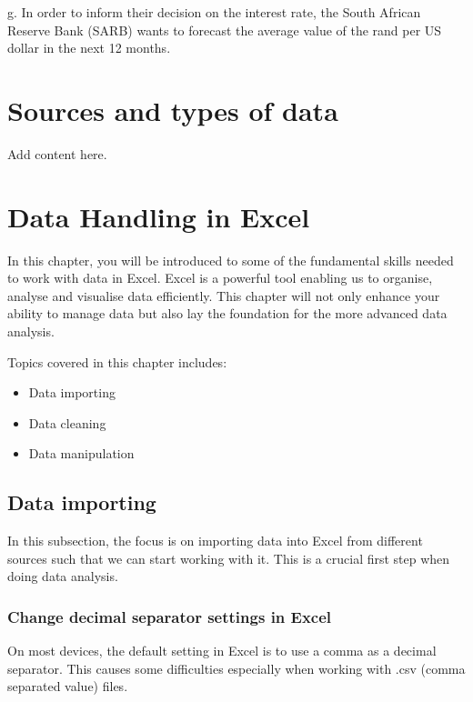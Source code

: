 \documentclass[
]{book}
\begin{document}
g. In order to inform their decision on the interest rate, the South African Reserve Bank (SARB) wants to forecast the average value of the rand per US dollar in the next 12 months.

\chapter{Sources and types of data}\label{ch2}

Add content here.

\chapter{Data Handling in Excel}\label{ch3}

In this chapter, you will be introduced to some of the fundamental skills needed to work with data in Excel. Excel is a powerful tool enabling us to organise, analyse and visualise data efficiently. This chapter will not only enhance your ability to manage data but also lay the foundation for the more advanced data analysis.

Topics covered in this chapter includes:

\begin{itemize}
\item
  Data importing
\item
  Data cleaning
\item
  Data manipulation
\end{itemize}

\section{Data importing}\label{data-importing}

In this subsection, the focus is on importing data into Excel from different sources such that we can start working with it. This is a crucial first step when doing data analysis.

\subsection{Change decimal separator settings in Excel}\label{change-decimal-separator-settings-in-excel}

On most devices, the default setting in Excel is to use a comma as a decimal separator. This causes some difficulties especially when working with .csv (comma separated value) files.

\newpage
\end{document}

